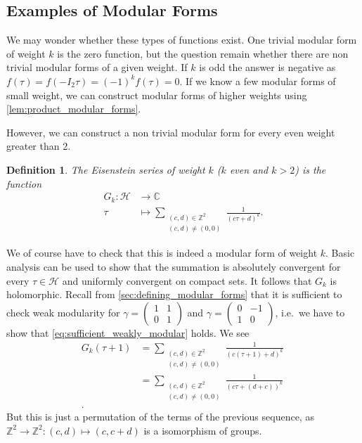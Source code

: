 \documentclass[a4paper]{article}
\theoremstyle{theoremdd}
\theoremstyle{definitiondd}
\newtheorem{definition}[theorem]{Definition}
\theoremstyle{remarkdd}
\newcommand{\Z}{\mathbb{Z}}
\newcommand{\C}{\mathbb{C}}
\begin{document}
\subsection{Examples of Modular Forms}
We may wonder whether these types of functions exist. One trivial modular form of weight $k$ is the zero function, but the question remain whether there are non trivial modular forms of a given weight.
If $k$ is odd the answer is negative as $f(\tau) = f(-I_2 \tau) = (-1)^{k} f(\tau) = 0$. 
If we know a few modular forms of small weight, we can construct modular forms of higher weights using \cref{lem:product_modular_forms}.

However, we can construct a non trivial modular form for every even weight greater than 2.
\begin{definition}
	The \emph{Eisenstein series of weight $k$} ($k$ even and  $k >2$) is the function
	\begin{align*}
		G_k: \mathcal{H} &\longrightarrow \C \\
		\tau &\longmapsto \sum_{\substack{(c,d) \in \Z^2 \\ (c,d)\ne (0,0) }} \frac{1}{(c\tau + d)^{k}}
	.\end{align*}
\end{definition}
We of course have to check that this is indeed a modular form of weight $k$. 
Basic analysis can be used to show that the summation is absolutely convergent for every  $\tau \in \mathcal{H}$ and uniformly convergent on compact sets.
It follows that $G_k$ is holomorphic.
Recall from \cref{sec:defining_modular_forms} that it is sufficient to check weak modularity for  $\gamma = \begin{pmatrix} 1 & 1 \\ 0 & 1 \end{pmatrix} $ and $\gamma = \begin{pmatrix} 0 & -1 \\ 1 & 0  \end{pmatrix} $, i.e.\ we have to show that \cref{eq:sufficient_weakly_modular} holds.
We see 
\begin{align*}
	G_k(\tau + 1) &= \sum_{\substack{(c, d) \in \Z^2 \\ (c, d) \ne (0,0)}} \frac{1}{(c (\tau + 1) + d)^{k}}\\
			 &= \sum_{\substack{(c, d) \in \Z^2 \\ (c, d) \ne (0,0)}} \frac{1}{(c \tau + (d+c))^{k}}\ \\
.\end{align*}
But this is just a permutation of the terms of the previous sequence, as $\Z^2 \to \Z^2: (c,d) \mapsto (c, c+ d)$ is a isomorphism of groups.
\end{document}
